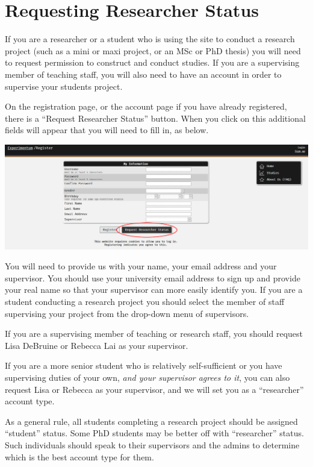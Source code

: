 \documentclass[]{book}
\begin{document}
\section{Requesting Researcher
Status}\label{requesting-researcher-status}

If you are a researcher or a student who is using the site to conduct a
research project (such as a mini or maxi project, or an MSc or PhD
thesis) you will need to request permission to construct and conduct
studies. If you are a supervising member of teaching staff, you will
also need to have an account in order to supervise your students
project.

On the registration page, or the account page if you have already
registered, there is a ``Request Researcher Status'' button. When you
click on this additional fields will appear that you will need to fill
in, as below.

\includegraphics{images/screenshots/requesting_status.png}

You will need to provide us with your name, your email address and your
supervisor. You should use your university email address to sign up and
provide your real name so that your supervisor can more easily identify
you. If you are a student conducting a research project you should
select the member of staff supervising your project from the drop-down
menu of supervisors.

\begin{info}
If you are a supervising member of teaching or research staff, you
should request Lisa DeBruine or Rebecca Lai as your supervisor.

If you are a more senior student who is relatively self-sufficient or
you have supervising duties of your own, \emph{and your supervisor
agrees to it}, you can also request Lisa or Rebecca as your supervisor,
and we will set you as a ``researcher'' account type.

As a general rule, all students completing a research project should be
assigned ``student'' status. Some PhD students may be better off with
``researcher'' status. Such individuals should speak to their
supervisors and the admins to determine which is the best account type
for them.
\end{info}
\end{document}
